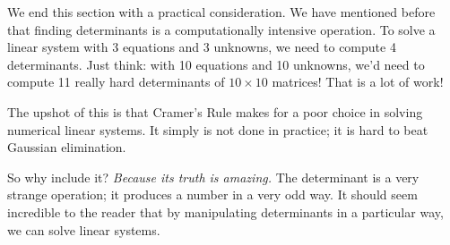 %
%
%
%
%

We end this section with a practical consideration. We have mentioned before that finding determinants is a computationally intensive operation. To solve a linear system with 3 equations and 3 unknowns, we need to compute 4 determinants. Just think: with 10 equations and 10 unknowns, we'd need to compute 11 really hard determinants of $10\times 10$ matrices! That is a lot of work!

The upshot of this is that Cramer's Rule makes for a poor choice in solving numerical linear systems. It simply is not done in practice; it is hard to beat Gaussian elimination.


So why include it? \textit{Because its truth is amazing.} The determinant is a very strange operation; it produces a number in a very odd way. It should seem incredible to the reader that by manipulating determinants in a particular way, we can solve linear systems.  


